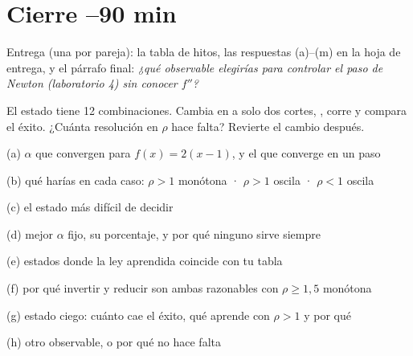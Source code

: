 \section{Cierre \hfill\small{}–90 min}
Entrega (una por pareja): la tabla de hitos, las respuestas (a)–(m) en la hoja de entrega, y el párrafo final: \emph{¿qué observable elegirías para controlar el paso de Newton (laboratorio 4) sin conocer $f''$?}

\begin{nota}
El estado tiene 12 combinaciones. Cambia  en  a solo dos cortes, , corre  y compara el éxito. ¿Cuánta resolución en $\rho$ hace falta? Revierte el cambio después.
\end{nota}

\clearpage
{}

\begin{respuesta}[1.9cm]{(a) $\alpha$ que convergen para $f(x)=2(x-1)$, y el que converge en un paso}\end{respuesta}
\begin{respuesta}[2.6cm]{(b) qué harías en cada caso: $\rho>1$ monótona · $\rho>1$ oscila · $\rho<1$ oscila}\end{respuesta}
\begin{respuesta}[1.6cm]{(c) el estado más difícil de decidir}\end{respuesta}
\begin{respuesta}[2.2cm]{(d) mejor $\alpha$ fijo, su porcentaje, y por qué ninguno sirve siempre}\end{respuesta}
\begin{respuesta}[1.9cm]{(e) estados donde la ley aprendida coincide con tu tabla}\end{respuesta}
\begin{respuesta}[1.9cm]{(f) por qué invertir y reducir son ambas razonables con $\rho\ge 1{,}5$ monótona}\end{respuesta}
\begin{respuesta}[2.8cm]{(g) estado ciego: cuánto cae el éxito, qué aprende con $\rho>1$ y por qué}\end{respuesta}
\begin{respuesta}[2.4cm]{(h) otro observable, o por qué no hace falta}\end{respuesta}

